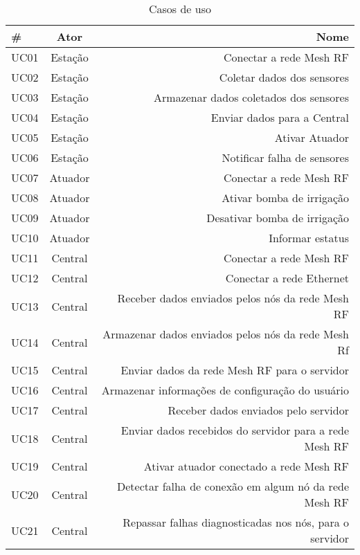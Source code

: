       \begin{table}[H]
        \begin{center}
          \caption{Casos de uso}
          \label{tab:usecase}
          \begin{tabular}{l|c|r} %
            \# & Ator & Nome\\
            \hline
            UC01 & Estação & Conectar a rede Mesh RF\\
            UC02 & Estação & Coletar dados dos sensores\\
            UC03 & Estação & Armazenar dados coletados dos sensores\\
            UC04 & Estação & Enviar dados para a Central\\
            UC05 & Estação & Ativar Atuador\\
            UC06 & Estação & Notificar falha de sensores\\
            UC07 & Atuador & Conectar a rede Mesh RF\\
            UC08 & Atuador & Ativar bomba de irrigação\\
            UC09 & Atuador & Desativar bomba de irrigação\\
            UC10 & Atuador & Informar estatus\\
            UC11 & Central & Conectar a rede Mesh RF\\
            UC12 & Central & Conectar a rede Ethernet\\
            UC13 & Central & Receber dados enviados pelos nós da rede Mesh RF\\
            UC14 & Central & Armazenar dados enviados pelos nós da rede Mesh Rf\\
            UC15 & Central & Enviar dados da rede Mesh RF para o servidor\\
            UC16 & Central & Armazenar informações de configuração do usuário\\
            UC17 & Central & Receber dados enviados pelo servidor\\
            UC18 & Central & Enviar dados recebidos do servidor para a rede Mesh RF\\
            UC19 & Central & Ativar atuador conectado a rede Mesh RF\\
            UC20 & Central & Detectar falha de conexão em algum nó da rede Mesh RF\\
            UC21 & Central & Repassar falhas diagnosticadas nos nós, para o servidor\\

\end{tabular}
\end{center}
\end{table}
